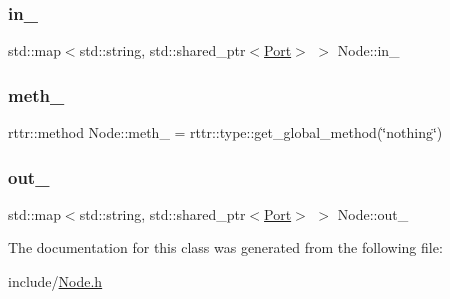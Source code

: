 \mbox{\label{class_node_a2970ced9f376dd6c5d512d0bbb7cbb54}} 
\subsubsection{\texorpdfstring{in\+\_\+}{in\_}}
{\footnotesize\ttfamily std\+::map$<$std\+::string, std\+::shared\+\_\+ptr$<$\hyperlink{class_port}{Port}$>$ $>$ Node\+::in\+\_\+\hspace{0.3cm}{\ttfamily [protected]}}

\mbox{\label{class_node_a34e4ef7089672adaa8aa31277aa5f159}} 
\subsubsection{\texorpdfstring{meth\+\_\+}{meth\_}}
{\footnotesize\ttfamily rttr\+::method Node\+::meth\+\_\+ = rttr\+::type\+::get\+\_\+global\+\_\+method(\char`\"{}nothing\char`\"{})\hspace{0.3cm}{\ttfamily [protected]}}

\mbox{\label{class_node_a324497db3924989e08e8ee0411d5972e}} 
\subsubsection{\texorpdfstring{out\+\_\+}{out\_}}
{\footnotesize\ttfamily std\+::map$<$std\+::string, std\+::shared\+\_\+ptr$<$\hyperlink{class_port}{Port}$>$ $>$ Node\+::out\+\_\+\hspace{0.3cm}{\ttfamily [protected]}}



The documentation for this class was generated from the following file\+:\begin{DoxyCompactItemize}
\item 
include/\hyperlink{_node_8h}{Node.\+h}\end{DoxyCompactItemize}
